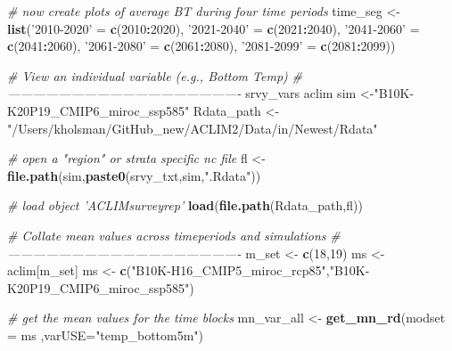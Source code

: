 \documentclass[
]{article}
\newenvironment{Shaded}{\begin{snugshade}}{\end{snugshade}}
\newcommand{\CommentTok}[1]{\textcolor[rgb]{0.56,0.35,0.01}{\textit{#1}}}
\newcommand{\DataTypeTok}[1]{\textcolor[rgb]{0.13,0.29,0.53}{#1}}
\newcommand{\DecValTok}[1]{\textcolor[rgb]{0.00,0.00,0.81}{#1}}
\newcommand{\KeywordTok}[1]{\textcolor[rgb]{0.13,0.29,0.53}{\textbf{#1}}}
\newcommand{\NormalTok}[1]{#1}
\newcommand{\OperatorTok}[1]{\textcolor[rgb]{0.81,0.36,0.00}{\textbf{#1}}}
\newcommand{\StringTok}[1]{\textcolor[rgb]{0.31,0.60,0.02}{#1}}
\begin{document}
\begin{Shaded}
\begin{Highlighting}[]
    \CommentTok{# now create plots of average BT during four time periods}
\NormalTok{    time_seg   <-}\StringTok{ }\KeywordTok{list}\NormalTok{(}\StringTok{'2010-2020'}\NormalTok{ =}\StringTok{ }\KeywordTok{c}\NormalTok{(}\DecValTok{2010}\OperatorTok{:}\DecValTok{2020}\NormalTok{),}
                        \StringTok{'2021-2040'}\NormalTok{ =}\StringTok{ }\KeywordTok{c}\NormalTok{(}\DecValTok{2021}\OperatorTok{:}\DecValTok{2040}\NormalTok{),}
                        \StringTok{'2041-2060'}\NormalTok{ =}\StringTok{ }\KeywordTok{c}\NormalTok{(}\DecValTok{2041}\OperatorTok{:}\DecValTok{2060}\NormalTok{),}
                        \StringTok{'2061-2080'}\NormalTok{ =}\StringTok{ }\KeywordTok{c}\NormalTok{(}\DecValTok{2061}\OperatorTok{:}\DecValTok{2080}\NormalTok{),}
                        \StringTok{'2081-2099'}\NormalTok{ =}\StringTok{ }\KeywordTok{c}\NormalTok{(}\DecValTok{2081}\OperatorTok{:}\DecValTok{2099}\NormalTok{))}
  
    \CommentTok{# View an individual variable (e.g., Bottom Temp)}
    \CommentTok{# -------------------------------------------------------}
\NormalTok{    srvy_vars}
\NormalTok{    aclim}
\NormalTok{    sim <-}\StringTok{"B10K-K20P19_CMIP6_miroc_ssp585"} 
\NormalTok{    Rdata_path <-}\StringTok{ "/Users/kholsman/GitHub_new/ACLIM2/Data/in/Newest/Rdata"}
    
    \CommentTok{# open a "region" or strata specific nc file}
\NormalTok{    fl      <-}\StringTok{ }\KeywordTok{file.path}\NormalTok{(sim,}\KeywordTok{paste0}\NormalTok{(srvy_txt,sim,}\StringTok{".Rdata"}\NormalTok{))}
    
    \CommentTok{# load object 'ACLIMsurveyrep'}
    \KeywordTok{load}\NormalTok{(}\KeywordTok{file.path}\NormalTok{(Rdata_path,fl))   }
    
    \CommentTok{# Collate mean values across timeperiods and simulations}
    \CommentTok{# -------------------------------------------------------}
\NormalTok{    m_set      <-}\StringTok{ }\KeywordTok{c}\NormalTok{(}\DecValTok{18}\NormalTok{,}\DecValTok{19}\NormalTok{)}
\NormalTok{    ms         <-}\StringTok{ }\NormalTok{aclim[m_set]}
\NormalTok{    ms         <-}\StringTok{ }\KeywordTok{c}\NormalTok{(}\StringTok{"B10K-H16_CMIP5_miroc_rcp85"}\NormalTok{,}\StringTok{"B10K-K20P19_CMIP6_miroc_ssp585"}\NormalTok{)}
    
    \CommentTok{# get the mean values for the time blocks}
\NormalTok{    mn_var_all <-}\StringTok{ }\KeywordTok{get_mn_rd}\NormalTok{(}\DataTypeTok{modset =}\NormalTok{ ms ,}\DataTypeTok{varUSE=}\StringTok{"temp_bottom5m"}\NormalTok{)}
    

\end{Highlighting}
\end{Shaded}
\end{document}
